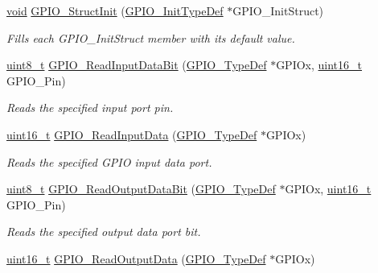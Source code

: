 \begin{DoxyCompactItemize}
\hyperlink{usb__devapi_8h_afabf60e7f57651d6d595a02c75f07cd0}{void} \hyperlink{group___g_p_i_o___private___functions_gab28de41278e7f8c63d0851e2733b10df}{G\+P\+I\+O\+\_\+\+Struct\+Init} (\hyperlink{struct_g_p_i_o___init_type_def}{G\+P\+I\+O\+\_\+\+Init\+Type\+Def} $\ast$G\+P\+I\+O\+\_\+\+Init\+Struct)
\begin{DoxyCompactList}\small\item\em Fills each G\+P\+I\+O\+\_\+\+Init\+Struct member with its default value. \end{DoxyCompactList}\item 
\hyperlink{_p_e___types_8h_aba7bc1797add20fe3efdf37ced1182c5}{uint8\+\_\+t} \hyperlink{group___g_p_i_o___private___functions_ga98772ef6b639b3fa06c8ae5ba28d3aaa}{G\+P\+I\+O\+\_\+\+Read\+Input\+Data\+Bit} (\hyperlink{struct_g_p_i_o___type_def}{G\+P\+I\+O\+\_\+\+Type\+Def} $\ast$G\+P\+I\+Ox, \hyperlink{_p_e___types_8h_a1f1825b69244eb3ad2c7165ddc99c956}{uint16\+\_\+t} G\+P\+I\+O\+\_\+\+Pin)
\begin{DoxyCompactList}\small\item\em Reads the specified input port pin. \end{DoxyCompactList}\item 
\hyperlink{_p_e___types_8h_a1f1825b69244eb3ad2c7165ddc99c956}{uint16\+\_\+t} \hyperlink{group___g_p_i_o___private___functions_ga139a33adc8409288e9f193bbebb5a0f7}{G\+P\+I\+O\+\_\+\+Read\+Input\+Data} (\hyperlink{struct_g_p_i_o___type_def}{G\+P\+I\+O\+\_\+\+Type\+Def} $\ast$G\+P\+I\+Ox)
\begin{DoxyCompactList}\small\item\em Reads the specified G\+P\+IO input data port. \end{DoxyCompactList}\item 
\hyperlink{_p_e___types_8h_aba7bc1797add20fe3efdf37ced1182c5}{uint8\+\_\+t} \hyperlink{group___g_p_i_o___private___functions_ga138270f8695b105b7c6ed405792919c1}{G\+P\+I\+O\+\_\+\+Read\+Output\+Data\+Bit} (\hyperlink{struct_g_p_i_o___type_def}{G\+P\+I\+O\+\_\+\+Type\+Def} $\ast$G\+P\+I\+Ox, \hyperlink{_p_e___types_8h_a1f1825b69244eb3ad2c7165ddc99c956}{uint16\+\_\+t} G\+P\+I\+O\+\_\+\+Pin)
\begin{DoxyCompactList}\small\item\em Reads the specified output data port bit. \end{DoxyCompactList}\item 
\hyperlink{_p_e___types_8h_a1f1825b69244eb3ad2c7165ddc99c956}{uint16\+\_\+t} \hyperlink{group___g_p_i_o___private___functions_gaf8938a34280b7dc3e39872a7c17bb323}{G\+P\+I\+O\+\_\+\+Read\+Output\+Data} (\hyperlink{struct_g_p_i_o___type_def}{G\+P\+I\+O\+\_\+\+Type\+Def} $\ast$G\+P\+I\+Ox)

\end{DoxyCompactItemize}
